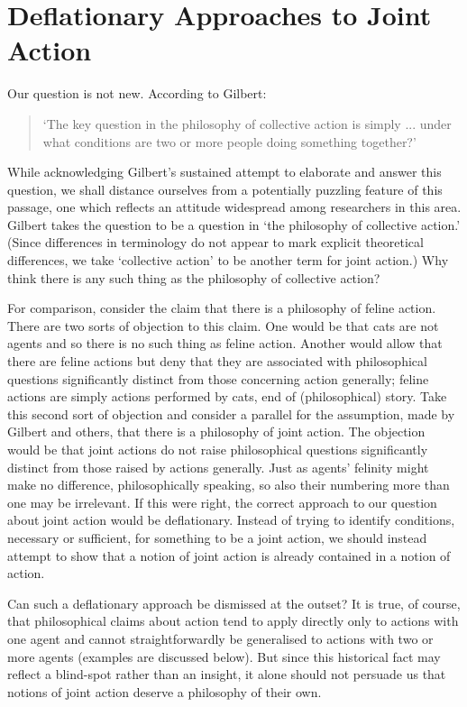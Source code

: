 \documentclass[12pt,a4paper]{extarticle}
\begin{document}
\label{end_section_the_question}


\section{Deflationary Approaches to Joint Action}
	\label{section_deflationary}

Our question is not new.
According to Gilbert:
%
\begin{quote}
`The key question in the philosophy of collective action is simply ... under what conditions are two or more people doing something together?' \citep[p.\ 67]{Gilbert:2010fk}
\end{quote}
%
While acknowledging Gilbert's sustained attempt to elaborate and answer this question, we shall distance ourselves from a
potentially puzzling feature of this passage, one which  reflects an attitude widespread among researchers in this area.
Gilbert takes the question to be a question in `the philosophy of collective action.' 
(Since differences in terminology do not appear to mark explicit theoretical differences, we take `collective action' to be another term for joint action.)
Why think there is any such thing as the philosophy of collective action?

For comparison, consider the claim that there is a philosophy of feline action.
There are two sorts of objection to this claim.
One would be that cats are not agents and so there is no such thing as feline action.
Another would allow that there are feline actions but deny that they are associated with philosophical questions significantly distinct from those concerning action generally;
feline actions are simply actions performed by cats, end of (philosophical) story.
Take this second sort of objection and consider a parallel for the assumption, made by Gilbert and others, that there is a philosophy of joint action.
The objection would be that joint actions do not raise philosophical questions significantly distinct from those raised by actions generally.
Just as agents' felinity might make no difference, philosophically speaking, so also their numbering more than one may be irrelevant.
If this were right, the correct approach to our question about joint action would be deflationary.
Instead of trying to identify conditions, necessary or sufficient, for something to be a joint action, we should instead attempt to show that a notion of joint action is already contained in a notion of action.

Can such a deflationary approach be dismissed at the outset?
It is true, of course, that philosophical claims about action tend to apply directly only to actions with one agent and cannot straightforwardly be generalised to actions with two or more agents (examples are discussed below).  
But since this historical fact may reflect a blind-spot rather than an insight, it alone should not persuade us that notions of joint action deserve a philosophy of their own.
\end{document}
